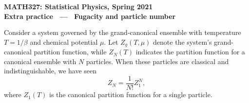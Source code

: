 \documentclass[12 pt]{article} %
\newcommand{\be}{\ensuremath{\beta} }
\begin{document}
\newcommand{\thisweek}{MATH327 Extra (Fugacity)}
\newcommand{\moddate}{Last modified 21 May 2021}
\begin{center}
  {\Large \textbf{MATH327: Statistical Physics, Spring 2021}} \\[12 pt]
  {\Large \textbf{Extra practice \ --- \ Fugacity and particle number}} \\[24 pt]
\end{center}

Consider a system governed by the grand-canonical ensemble with temperature $T = 1/ \be$ and chemical potential $\mu$.
Let $Z_g(T, \mu)$ denote the system's grand-canonical partition function, while $Z_N(T)$ indicates the partition function for a canonical ensemble with $N$ particles.
When these particles are classical and indistinguishable, we have seen
\begin{equation*}
  Z_N = \frac{1}{N!} Z_1^N,
\end{equation*}
where $Z_1(T)$ is the canonical partition function for a single particle.
\end{document}
